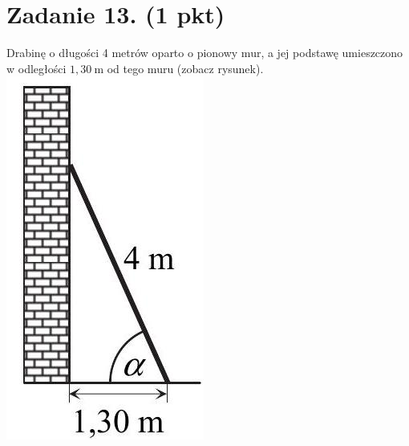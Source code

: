 \documentclass[10pt]{article}
\begin{document}
\section*{Zadanie 13. (1 pkt)}
Drabinę o długości 4 metrów oparto o pionowy mur, a jej podstawę umieszczono w odległości \(1,30 \mathrm{~m}\) od tego muru (zobacz rysunek).\\
\includegraphics[max width=\textwidth, center]{2024_11_21_e19607c15353cb4d7e48g-06}
\end{document}
